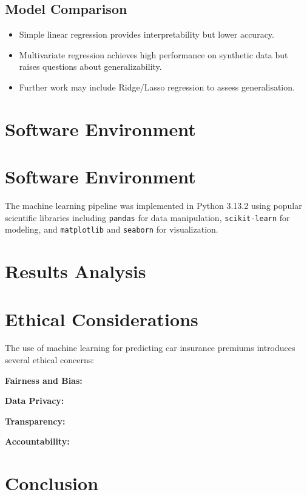 \documentclass{article}
\begin{document}
\subsection{Model Comparison}

\begin{itemize}
\item Simple linear regression provides interpretability but lower accuracy.
\item Multivariate regression achieves high performance on synthetic data but raises questions about generalizability.
\item Further work may include Ridge/Lasso regression to assess generalisation.
\end{itemize}

\newpage
\section{Software Environment}


\section{Software Environment}

The machine learning pipeline was implemented in Python 3.13.2 using popular scientific libraries including \texttt{pandas} for data manipulation, \texttt{scikit-learn} for modeling, and \texttt{matplotlib} and \texttt{seaborn} for visualization.



\newpage
\section{Results Analysis}

\newpage
\section{Ethical Considerations}

The use of machine learning for predicting car insurance premiums introduces several ethical concerns:

\textbf{Fairness and Bias:} 

\textbf{Data Privacy:} 

\textbf{Transparency:} 

\textbf{Accountability:} 

\newpage
\section{Conclusion}

\newpage

\printbibliography
\end{document}

